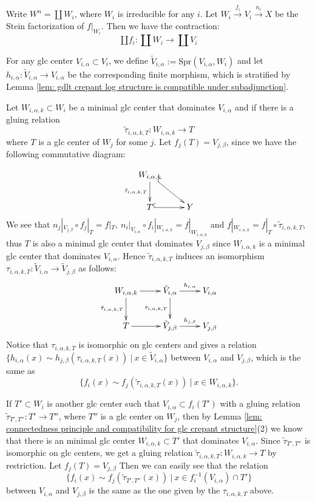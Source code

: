 \documentclass[11pt]{amsart}
\numberwithin{equation}{section}
\newcommand{\Spr}{\mathrm{Spr}}
\theoremstyle{definition}
\theoremstyle{definition}
\theoremstyle{definition}
\begin{document}
Write $W^n=\coprod W_i$, where $W_i$ is irreducible for any $i$. Let $W_i\stackrel{f_i}{\longrightarrow} V_i\stackrel{n_i}{\longrightarrow}X$ be the Stein factorization of $f|_{W_i}$. Then we have the contraction:
$$
\amalg f_i: \coprod W_i \to \coprod V_i
$$


For any glc center $V_{i,\alpha}\subset V_i$, we define $\tilde{V}_{i,\alpha}:=\Spr(V_{i,\alpha},W_i)$ and let $h_{i,\alpha}:\tilde{V}_{i,\alpha}\to V_{i,\alpha}$ be the corresponding finite morphism, which is stratified by Lemma \ref{lem: gdlt crepant log structure is compatible under subadjunction}.

Let $W_{i,\alpha,k}\subset W_i$ be a minimal glc center that dominates $V_{i,\alpha}$ and if there is a gluing relation 
$$
\tilde{\tau}_{i,\alpha,k,T}:W_{i,\alpha,k}\to T
$$
where $T$ is a glc center of $W_j$ for some $j$. Let $f_j(T)=V_{j,\beta}$, since we have the following commutative diagram:

\begin{displaymath}
    \xymatrix{
        W_{i,\alpha,k} \ar@{^(->}[dr]\ar@{->}[d]_{\tilde{\tau}_{i,\alpha,k,T}} \\
        T \ar@{^(->}[r] & Y
    }
\end{displaymath}
We see that $n_j|_{V_{j,\beta}}\circ f_j|_{T}=f|_{T},~n_i|_{V_{i,\alpha}}\circ f_i|_{W_{i,\alpha,k}}=f|_{W_{i,\alpha,k}}$ and $f|_{W_{i,\alpha,k}}=f|_T\circ\tilde{\tau}_{i,\alpha,k,T}$, thus $T$ is also a minimal glc center that dominates $V_{j,\beta}$ since $W_{i,\alpha,k}$ is a minimal glc center that dominates $V_{i,\alpha}$. Hence $\tilde{\tau}_{i,\alpha,k,T}$ induces an isomorphism $\tau_{i,\alpha,k,T}: \tilde{V}_{i,\alpha}\to\tilde{V}_{j,\beta}$ as follows: 
\begin{displaymath}
    \xymatrix{
        W_{i,\alpha,k} \ar[r]\ar[d]_{\tilde{\tau}_{i,\alpha,k,T}}& \tilde{V}_{i,\alpha}\ar[r]^{h_{i,\alpha}}\ar[d]_{\tau_{i,\alpha,k,T}} & V_{i,\alpha} \\
        T \ar[r]             & \tilde{V}_{j,\beta}\ar[r]^{h_{j,\beta}}  & V_{j,\beta}
    }
\end{displaymath}
Notice that $\tau_{i,\alpha,k,T}$ is isomorphic on glc centers and gives a relation $\{h_{i,\alpha}(x)\sim h_{j,\beta}(\tau_{i,\alpha,k,T}(x))~|~x\in \tilde{V}_{i,\alpha}\}$ between $V_{i,\alpha}$ and $V_{j,\beta}$, which is the same as 
$$
\{f_i(x)\sim f_j(\tilde{\tau}_{i,\alpha,k,T}(x))~|~x\in W_{i,\alpha,k}\}.
$$

If $T'\subset W_i$ is another glc center such that $V_{i,\alpha}\subset f_i(T')$ with a gluing relation $\tilde{\tau}_{T',T''}:T'\to T''$, where $T''$ is a glc center on $W_j$, then by Lemma \ref{lem: connectedness principle and compatibility for glc crepant structure}(2) we know that there is an minimal glc center $W_{i,\alpha,k}\subset T'$ that dominates $V_{i,\alpha}$. Since $\tilde{\tau}_{T',T''}$ is isomorphic on glc centers, we get a gluing relation $\tilde{\tau}_{i,\alpha,k,T}:W_{i,\alpha,k}\to T$ by restriction. Let $f_j(T)=V_{j,\beta}$ Then we can easily see that the relation
$$
\{f_i(x)\sim f_j(\tilde{\tau}_{T',T''}(x))~|~x\in f_i^{-1}(V_{i,\alpha})\cap T'\}
$$
between $V_{i,\alpha}$ and $V_{j,\beta}$ is the same as the one given by the $\tau_{i,\alpha,k,T}$ 
above. 
\end{document}
